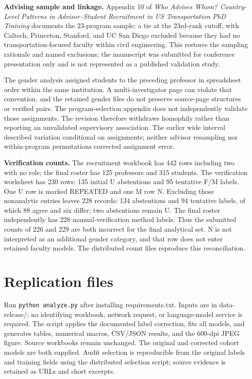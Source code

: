 \documentclass[11pt]{article}
\begin{document}
\textbf{Advising sample and linkage.} Appendix 10 of \emph{Who Advises Whom? Country-Level Patterns in Advisor--Student Recruitment in US Transportation PhD Training}  documents the 23-program sample: a tie at the 23rd-rank cutoff, with Caltech, Princeton, Stanford, and UC San Diego excluded because they had no transportation-focused faculty within civil engineering. This restores the sampling rationale and named exclusions; the manuscript was submitted for conference presentation only and is not represented as a published validation study.

The gender analysis assigned students to the preceding professor in spreadsheet order within the same institution. A multi-investigator page can violate that convention, and the retained gender files do not preserve source-page structures or verified pairs. The program-selection appendix does not independently validate those assignments. The revision therefore withdraws homophily rather than reporting an unvalidated supervisory association. The earlier wide interval described variation conditional on assignments; neither advisor resampling nor within-program permutations corrected assignment error.

\textbf{Verification counts.} The recruitment workbook has 442 rows including two with no role; the final roster has 125 professors and 315 students. The verification worksheet has 230 rows: 135 initial U abstentions and 95 tentative F/M labels. One U row is marked REPEATED and one M row N. Excluding those nonanalytic entries leaves 228 records: 134 abstentions and 94 tentative labels, of which 88 agree and six differ; two abstentions remain U. The final roster independently has 228 manual-verification method labels. Thus the submitted counts of 226 and 229 are both incorrect for the final analytical set. N is not interpreted as an additional gender category, and that row does not enter retained faculty models. The distributed count files reproduce this reconciliation.

\section{Replication files}\label{sec:replication}
Run \texttt{python analyze.py} after installing requirements.txt. Inputs are in data-release/; no identifying workbook, network request, or language-model service is required. The script applies the documented label correction, fits all models, and generates tables, numerical macros, CSV/JSON results, and the 600-dpi JPEG figure. Source workbooks remain unchanged. The original and corrected cohort models are both supplied. Audit selection is reproducible from the original labels and training fields using the distributed selection script; source evidence is retained as URLs and short excerpts.
\end{document}

